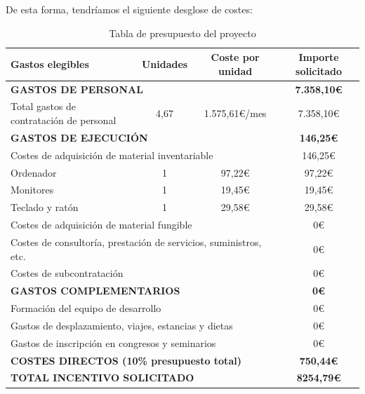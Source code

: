 De esta forma, tendríamos el siguiente desglose de costes:
\begin{table}[H]
    \begin{center}
        \begin{tabularx}{\textwidth}{|X|c|c|c|}
            \hline
            \textbf{Gastos elegibles} & \textbf{Unidades} & \textbf{Coste por unidad} & \textbf{Importe solicitado} \\
            \hline
            \multicolumn{3}{|l|}{\textbf{GASTOS DE PERSONAL}} & \textbf{7.358,10\euro} \\
            Total gastos de contratación de personal & 4,67 & 1.575,61\euro/mes & 7.358,10\euro \\
            \hline
            \multicolumn{3}{|l|}{\textbf{GASTOS DE EJECUCIÓN}} & \textbf{146,25\euro} \\
            \multicolumn{3}{|l|}{Costes de adquisición de material inventariable} & 146,25\euro \\
            \quad Ordenador & 1 & 97,22\euro & 97,22\euro \\
            \quad Monitores & 1 & 19,45\euro & 19,45\euro \\
            \quad Teclado y ratón & 1 & 29,58\euro & 29,58\euro \\
            \multicolumn{3}{|l|}{Costes de adquisición de material fungible} & 0\euro \\
            \multicolumn{3}{|l|}{Costes de consultoría, prestación de servicios, suministros, etc.} & 0\euro \\
            \multicolumn{3}{|l|}{Costes de subcontratación} & 0\euro \\
            \multicolumn{3}{|l|}{\textbf{GASTOS COMPLEMENTARIOS}} & \textbf{0\euro} \\
            \multicolumn{3}{|l|}{Formación del equipo de desarrollo} & 0\euro \\
            \multicolumn{3}{|l|}{Gastos de desplazamiento, viajes, estancias y dietas} & 0\euro \\
            \multicolumn{3}{|l|}{Gastos de inscripción en congresos y seminarios} & 0\euro \\
            \hline
            \multicolumn{3}{|l|}{\textbf{COSTES DIRECTOS (10\% presupuesto total)}} & \textbf{750,44\euro} \\
            \hline
            \multicolumn{3}{|l|}{\textbf{TOTAL INCENTIVO SOLICITADO}} & \textbf{8254,79\euro} \\
            \hline
        \end{tabularx}
    \end{center}
    \caption{Tabla de presupuesto del proyecto}\label{tab:presupuesto}
\end{table}



